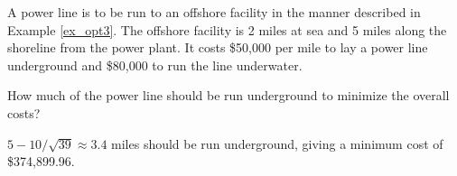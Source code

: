{A power line is to be run to an offshore facility in the manner described in Example \ref{ex_opt3}. The offshore facility is 2 miles at sea and 5 miles along the shoreline from the power plant. It costs \$50,000 per mile to lay a power line underground and \$80,000 to run the line underwater. 

How much of the power line should be run underground to minimize the overall costs?
}
{$5-10/\sqrt{39} \approx 3.4$ miles should be run underground, giving a minimum cost of \$374,899.96.
}

